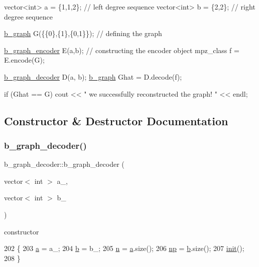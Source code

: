 \begin{DoxyCode}
vector<int> a = \{1,1,2\}; \textcolor{comment}{// left degree sequence }
vector<int> b = \{2,2\}; \textcolor{comment}{// right degree sequence}

\hyperlink{classb__graph}{b\_graph} G(\{\{0\},\{1\},\{0,1\}\}); \textcolor{comment}{// defining the graph}

\hyperlink{classb__graph__encoder}{b\_graph\_encoder} E(a,b); \textcolor{comment}{// constructing the encoder object}
mpz\_class f = E.encode(G);

\hyperlink{classb__graph__decoder}{b\_graph\_decoder} D(a, b);
\hyperlink{classb__graph}{b\_graph} Ghat = D.decode(f);

\textcolor{keywordflow}{if} (Ghat == G)
   cout << \textcolor{stringliteral}{" we successfully reconstructed the graph! "} << endl;
\end{DoxyCode}
 

\subsection{Constructor \& Destructor Documentation}
\mbox{\label{classb__graph__decoder_a2284e65bb4fcdd9356fc6a3109c2a4a7}} 
\subsubsection{\texorpdfstring{b\+\_\+graph\+\_\+decoder()}{b\_graph\_decoder()}}
{\footnotesize\ttfamily b\+\_\+graph\+\_\+decoder\+::b\+\_\+graph\+\_\+decoder (\begin{DoxyParamCaption}\item[{vector$<$ int $>$}]{a\+\_\+,  }\item[{vector$<$ int $>$}]{b\+\_\+ }\end{DoxyParamCaption})}



constructor 


\begin{DoxyCode}
202 \{
203   \hyperlink{classb__graph__decoder_afcf783e4199fb8f9d6828db08bb12333}{a} = a\_;
204   \hyperlink{classb__graph__decoder_a12d1a4a91f342111d2116196cb826317}{b} = b\_;
205   \hyperlink{classb__graph__decoder_a2caddd63df6808c95e2ee738f7c77870}{n} = \hyperlink{classb__graph__decoder_afcf783e4199fb8f9d6828db08bb12333}{a}.size();
206   \hyperlink{classb__graph__decoder_a7eca48cf8793e722d1b29dbdc9fd2dca}{np} = \hyperlink{classb__graph__decoder_a12d1a4a91f342111d2116196cb826317}{b}.size();
207   \hyperlink{classb__graph__decoder_a9498e8aa7391480cc663bffef3718c6b}{init}();
208 \}
\end{DoxyCode}


